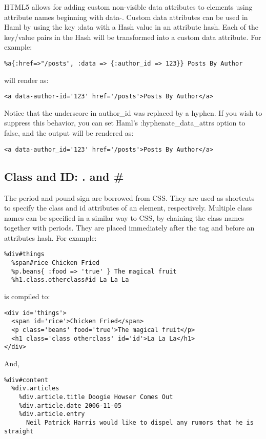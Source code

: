 \documentclass[9pt]{article}
\begin{document}
 HTML5 allows for adding custom non-visible data attributes to elements using attribute names beginning with data-. Custom data attributes can be used in Haml by using the key :data with a Hash value in an attribute hash. Each of the key/value pairs in the Hash will be transformed into a custom data attribute. For example:
\begin{verbatim}
%a{:href=>"/posts", :data => {:author_id => 123}} Posts By Author
\end{verbatim}


 will render as:
\begin{verbatim}
<a data-author-id='123' href='/posts'>Posts By Author</a>
\end{verbatim}


 Notice that the underscore in author\_id was replaced by a hyphen. If you wish to suppress this behavior, you can set Haml’s :hyphenate\_data\_attrs option to false, and the output will be rendered as:
\begin{verbatim}
<a data-author_id='123' href='/posts'>Posts By Author</a>
\end{verbatim}
\subsection{Class and ID: . and \#}


 The period and pound sign are borrowed from CSS. They are used as shortcuts to specify the class and id attributes of an element, respectively. Multiple class names can be specified in a similar way to CSS, by chaining the class names together with periods. They are placed immediately after the tag and before an attributes hash. For example:
\begin{verbatim}
%div#things
  %span#rice Chicken Fried
  %p.beans{ :food => 'true' } The magical fruit
  %h1.class.otherclass#id La La La
\end{verbatim}


 is compiled to:
\begin{verbatim}
<div id='things'>
  <span id='rice'>Chicken Fried</span>
  <p class='beans' food='true'>The magical fruit</p>
  <h1 class='class otherclass' id='id'>La La La</h1>
</div>
\end{verbatim}


 And,
\begin{verbatim}
%div#content
  %div.articles
    %div.article.title Doogie Howser Comes Out
    %div.article.date 2006-11-05
    %div.article.entry
      Neil Patrick Harris would like to dispel any rumors that he is straight
\end{verbatim}
\end{document}
